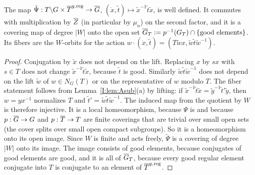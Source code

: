 \begin{lemma}\label{I:lem:Acover}
The map $\tilde\Psi:T\backslash G\times\overline{T}^{g,\mathrm{reg}}\to\overline{G}$, $(\dot x,\tilde t)\mapsto\tilde x^{-1}\tilde t\tilde x$, is well defined. It commutes with multiplication by $\overline{Z}$ (in particular by $\mu_n$) on the second factor, and it is a covering map of degree $|W|$ onto the open set $\overline{G}_T:=p^{-1}(G_T)\cap\{\text{good elements}\}$. Its fibers are the $W$-orbits for the action $w\cdot(\dot x,\tilde t)=(T\tilde w x,\tilde w\tilde t\tilde w^{-1})$.
\end{lemma}
\begin{proof}
Conjugation by $\tilde x$ does not depend on the lift. Replacing $x$ by $sx$ with $s\in T$ does not change $\tilde x^{-1}\tilde t\tilde x$, because $\tilde t$ is good. Similarly $\tilde w\tilde t\tilde w^{-1}$ does not depend on the lift $\tilde w$ of $w\in N_G(T)$ or on the representative of $w$ modulo $T$. The fiber statement follows from Lemma~\ref{I:lem:Asub}(a) by lifting: if $\tilde x^{-1}\tilde t\tilde x=\tilde y^{-1}\tilde t'\tilde y$, then $w=yx^{-1}$ normalizes $T$ and $\tilde t'=\tilde w\tilde t\tilde w^{-1}$. The induced map from the quotient by $W$ is therefore injective. It is a local homeomorphism, because $\Psi$ is and because $p:\overline{G}\to G$ and $p:\overline{T}\to T$ are finite coverings that are trivial over small open sets (the cover splits over small open compact subgroups). So it is a homeomorphism onto its open image. Since $W$ is finite and acts freely, $\tilde\Psi$ is a covering of degree $|W|$ onto its image. The image consists of good elements, because conjugates of good elements are good, and it is all of $\overline{G}_T$, because every good regular element conjugate into $T$ is conjugate to an element of $\overline{T}^{g,\mathrm{reg}}$.
\end{proof}

